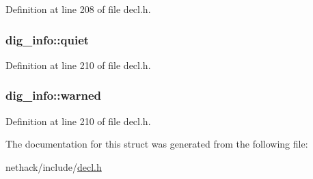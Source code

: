 Definition at line 208 of file decl.\+h.

\hypertarget{structdig__info_af3e6957d329c4568059d05c272364020}{
\subsubsection[{quiet}]{ dig\+\_\+info\+::quiet}}\label{structdig__info_af3e6957d329c4568059d05c272364020}


Definition at line 210 of file decl.\+h.

\hypertarget{structdig__info_a948c106179b81443e03efab29dabc0d9}{
\subsubsection[{warned}]{ dig\+\_\+info\+::warned}}\label{structdig__info_a948c106179b81443e03efab29dabc0d9}


Definition at line 210 of file decl.\+h.



The documentation for this struct was generated from the following file\+:\begin{DoxyCompactItemize}
\item 
nethack/include/\hyperlink{decl_8h}{decl.\+h}\end{DoxyCompactItemize}
